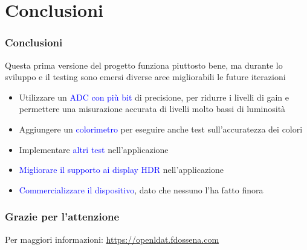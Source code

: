 \documentclass{beamer}
\begin{document}
\section{Conclusioni}
\begin{frame}
	\frametitle{Conclusioni}
	Questa prima versione del progetto funziona piuttosto bene, ma durante lo sviluppo e il testing sono emersi diverse aree migliorabili le future iterazioni
	\begin{itemize}
		\item Utilizzare un \textcolor{blue}{ADC con più bit} di precisione, per ridurre i livelli di gain e permettere una misurazione accurata di livelli molto bassi di luminosità
		\item Aggiungere un \textcolor{blue}{colorimetro} per eseguire anche test sull'accuratezza dei colori
		\item Implementare \textcolor{blue}{altri test} nell'applicazione
		\item \textcolor{blue}{Migliorare il supporto ai display HDR} nell'applicazione
		\item \textcolor{blue}{Commercializzare il dispositivo}, dato che nessuno l'ha fatto finora
	\end{itemize}
\end{frame}
\begin{frame}
	\frametitle{Grazie per l'attenzione}
	\centering
	Per maggiori informazioni:
	\textcolor{blue}{\url{https://openldat.fdossena.com}}
\end{frame}
\end{document}
